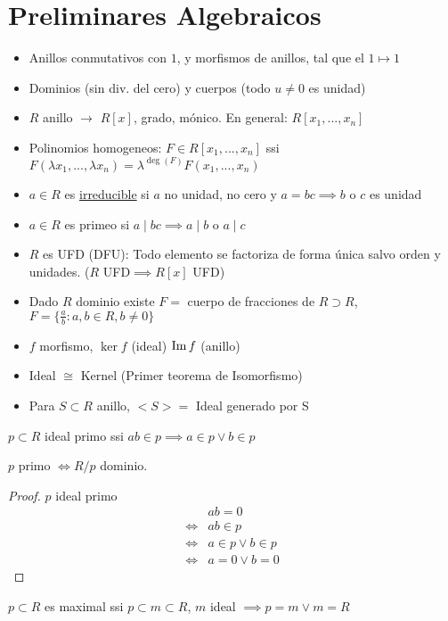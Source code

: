 \section{Preliminares Algebraicos}
\begin{itemize}
    \item Anillos conmutativos con $1$, y morfismos de anillos, tal que el $1\mapsto1$
    \item Dominios (sin div. del cero) y cuerpos (todo $u\neq0$ es unidad)
    \item $R$ anillo $\rightarrow$ $R[x]$, grado, mónico. En general: $R[x_1,...,x_n]$
    \item Polinomios homogeneos: $F\in R[x_1,...,x_n]$ ssi $F(\lambda x_1,...,\lambda x_n)=\lambda^{\deg(F)}F(x_1,...,x_n)$
    \item $a\in R$ es \underline{irreducible} si $a$ no unidad, no cero y $a=bc\implies b$ o $c$ es unidad
    \item $a\in R$ es primeo si $a\mid bc\implies a\mid b$ o $a\mid c$
    \item $R$ es UFD (DFU): Todo elemento se factoriza de forma única salvo orden y unidades. ($R$ UFD$\implies R[x]$ UFD)
    \item Dado $R$ dominio existe $F=$ cuerpo de fracciones de $R\supset R$, $F=\{\frac{a}{b}:a,b\in R, b\neq 0\}$
    \item $f$ morfismo, $\ker f$ (ideal) $\operatorname{Im} f$ (anillo)
    \item Ideal $\cong$ Kernel (Primer teorema de Isomorfismo)
    \item Para $S\subset R$ anillo, $<S>=$  Ideal generado por S
\end{itemize}
\begin{defn}
    $p\subset R$ ideal primo ssi $ab\in p\implies a\in p\vee b\in p$
\end{defn}
\begin{thm}
    $p$ primo $\iff R/p$ dominio.
\end{thm}
\begin{proof}
    $p$ ideal primo
    \begin{align*}
             & ab=0              \\
        \iff & ab\in p           \\
        \iff & a\in p\vee b\in p \\
        \iff & a=0\vee b=0
    \end{align*}
\end{proof}
\begin{defn}
    $p\subset R$ es maximal ssi $p\subset m\subset R$, $m$ ideal $\implies p=m\vee m=R$
\end{defn}
